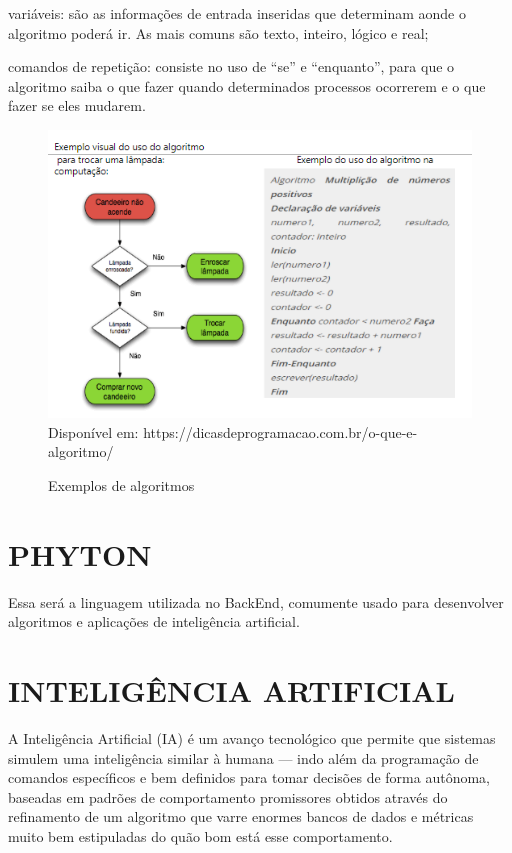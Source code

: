 \begin{description}
	\setlength\itemindent{15pt}
	\item[•] variáveis: são as informações de entrada inseridas que determinam aonde o algoritmo poderá ir. As mais comuns são texto, inteiro, lógico e real; 
	\item[•] comandos de repetição: consiste no uso de “se” e “enquanto”, para que o algoritmo saiba o que fazer quando determinados processos ocorrerem e o que fazer se eles mudarem.
	\cite{medina2006algoritmos}
\end{description}

\begin{figure}[H]
	\centering
	\caption{Exemplos de algoritmos}
	\centering
	\includegraphics{./images/Figure_7}	
	\label{fig:Fig7}
	\centering
	\\Disponível em: https://dicasdeprogramacao.com.br/o-que-e-algoritmo/  
\end{figure}

\section{PHYTON}
\label{sec:PHYTON}
Essa será a linguagem utilizada no BackEnd, comumente usado para desenvolver algoritmos e aplicações de inteligência artificial. 

\section{INTELIGÊNCIA ARTIFICIAL}
\label{sec:inteligênciaartificial}

A Inteligência Artificial (IA) é um avanço tecnológico que permite que sistemas simulem uma inteligência similar à humana — indo além da programação de comandos específicos e bem definidos para tomar decisões de forma autônoma, baseadas em padrões de comportamento promissores obtidos através do refinamento de um algoritmo que varre enormes bancos de dados e métricas muito bem estipuladas do quão bom está esse comportamento. 

